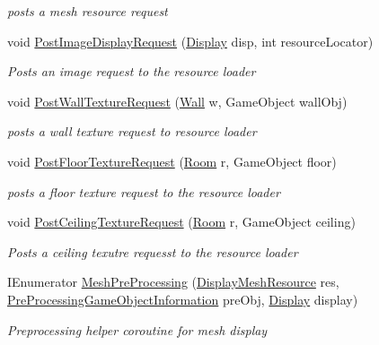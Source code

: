 \begin{DoxyCompactItemize}
\begin{DoxyCompactList}\small\item\em posts a mesh resource request \end{DoxyCompactList}\item 
void \mbox{\hyperlink{class_museum_builder_a4d5a59830643d185fbda5b11a251ffc3}{Post\+Image\+Display\+Request}} (\mbox{\hyperlink{class_display}{Display}} disp, int resource\+Locator)
\begin{DoxyCompactList}\small\item\em Posts an image request to the resource loader \end{DoxyCompactList}\item 
void \mbox{\hyperlink{class_museum_builder_aa4b2759977e29fa40cea22b6f31242ac}{Post\+Wall\+Texture\+Request}} (\mbox{\hyperlink{class_wall}{Wall}} w, Game\+Object wall\+Obj)
\begin{DoxyCompactList}\small\item\em posts a wall texture request to resource loader \end{DoxyCompactList}\item 
void \mbox{\hyperlink{class_museum_builder_a18b0a6f67d3e9053b604c5a7caf9d4b0}{Post\+Floor\+Texture\+Request}} (\mbox{\hyperlink{class_room}{Room}} r, Game\+Object floor)
\begin{DoxyCompactList}\small\item\em posts a floor texture request to the resource loader \end{DoxyCompactList}\item 
void \mbox{\hyperlink{class_museum_builder_a5b79838dee5015763177bdceca168f5c}{Post\+Ceiling\+Texture\+Request}} (\mbox{\hyperlink{class_room}{Room}} r, Game\+Object ceiling)
\begin{DoxyCompactList}\small\item\em Posts a ceiling texutre requesst to the resource loader \end{DoxyCompactList}\item 
I\+Enumerator \mbox{\hyperlink{class_museum_builder_a695eba49b601fcd36a6f5477ce2c1511}{Mesh\+Pre\+Processing}} (\mbox{\hyperlink{class_display_mesh_resource}{Display\+Mesh\+Resource}} res, \mbox{\hyperlink{class_pre_processing_game_object_information}{Pre\+Processing\+Game\+Object\+Information}} pre\+Obj, \mbox{\hyperlink{class_display}{Display}} display)
\begin{DoxyCompactList}\small\item\em Preprocessing helper coroutine for mesh display \end{DoxyCompactList}\end{DoxyCompactItemize}
